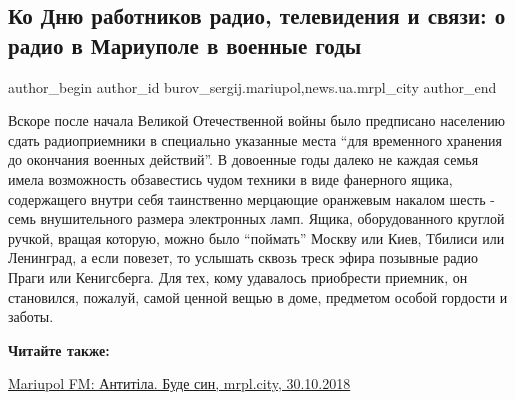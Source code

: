  
 
 
 
 
 
\subsection{Ко Дню работников радио, телевидения и связи: о радио в Мариуполе в военные годы}
\label{sec:15_11_2019.stz.news.ua.mrpl_city.1.o_radio}
 
\ifcmt
 author_begin
   author_id burov_sergij.mariupol,news.ua.mrpl_city
 author_end
\fi

Вскоре после начала Великой Отечественной войны было предписано населению сдать
радиоприемники в специально указанные места \enquote{для временного хранения до
окончания военных действий}. В довоенные годы далеко не каждая семья имела
возможность обзавестись чудом техники в виде фанерного ящика, содержащего
внутри себя таинственно мерцающие оранжевым накалом шесть - семь внушительного
размера электронных ламп. Ящика, оборудованного круглой ручкой, вращая которую,
можно было \enquote{поймать} Москву или Киев, Тбилиси или Ленинград, а если повезет, то
услышать сквозь треск эфира позывные радио Праги или Кенигсберга. Для тех, кому
удавалось приобрести приемник, он становился, пожалуй, самой ценной вещью в
доме, предметом особой гордости и заботы.


\textbf{Читайте также:} 

\href{https://mrpl.city/blogs/view/mariupol-fm-antitila-bude-sin}{Mariupol FM: Антитіла. Буде син, mrpl.city, 30.10.2018}

